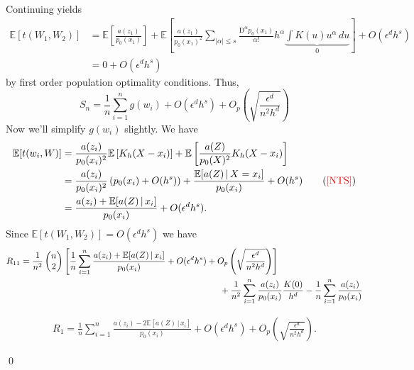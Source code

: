 \documentclass[11pt]{article}
\newcommand{\nts}{{\color{red}[NTS]}}
\begin{document}
Continuing yields
\begin{align*}
    \mathbb{E}[t(W_1, W_2)] &= \mathbb{E}\left[\frac{a(z_1)}{p_0(x_1)}\right] + \mathbb{E}\left[\frac{a(z_1)}{p_0(x_1)^2}\sum_{|\alpha| \leq s}\frac{\text{D}^\alpha p_0(x_1)}{\alpha!}h^\alpha \underbrace{\int K\left(u\right) u^\alpha \,du}_{0}\right]  + O(\epsilon ^dh^s) \\
    &= 0 + O(\epsilon^d h^s)
\end{align*}
by first order population optimality conditions. Thus,
\[S_n = \frac{1}{n} \sum_{i = 1}^n g(w_i ) + O(\epsilon^dh^s) + O_p\left( \sqrt{\frac{\epsilon^d}{n^2h^d}}\right)\]
Now we'll simplify $g(w_i)$ slightly. We have
\begin{align*}
    \mathbb{E}[t(w_i, W)] &=  
    \frac{a(z_i)}{p_0(x_i)^2}\mathbb{E}\left[K_h(X - x_i)\right] + \mathbb{E}\left[\frac{a(Z)}{p_0(X)^2}K_h(X - x_i)\right] \\
    &= \frac{a(z_i)}{p_0(x_i)^2}\left(p_0(x_i) + O(h^s)\right) + \frac{\mathbb{E}[a(Z)\, | \, X = x_i]}{p_0(x_i)} + O(h^s) \tag{\nts} \\
    &= \frac{a(z_i) + \mathbb{E}[a(Z)\,| \,x_i]}{p_0(x_i)} + O(\epsilon^dh^s). 
\end{align*}
Since $\mathbb{E}[t(W_1, W_2)] = O(\epsilon^dh^s)$ we have
\begin{align*}
    R_{11} &= \frac{1}{n^2}\begin{pmatrix}
        n \\
        2
    \end{pmatrix}\left[\frac{1}{n} \sum_{i = 1}^n \frac{a(z_i) + \mathbb{E}[a(Z)\,| \,x_i]}{p_0(x_i)} + O(\epsilon^dh^s) + O_p\left( \sqrt{\frac{\epsilon^d}{n^2h^d}}\right)\right]\\& \hspace{80mm} + \frac{1}{n^2}\sum_{i = 1}^n\frac{a(z_i)}{p_0(x_i)}\frac{K(0)}{h^d} - \frac{1}{n}\sum_{i = 1}^n \frac{a(z_i)}{p_0(x_i)}
\end{align*}

\begin{align*}
    R_1 = \frac{1}{n}\sum_{i = 1}^n \frac{a(z_i) - 2\mathbb{E}[a(Z)\,|\,x_i]}{p_0(x_i)} + O(\epsilon^dh^s) + O_p\left( \sqrt{\frac{\epsilon^d}{n^2h^d}}\right) .
\end{align*}

\qed{}
\end{document}

